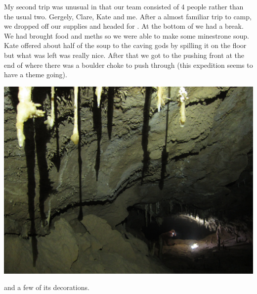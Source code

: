 
My second trip was unusual in that our team consisted of 4 people rather than the usual two. Gergely, Clare, Kate and me. After a almost familiar trip to camp, we dropped off our supplies and headed for . At the bottom of  we had a break. We had brought food and meths so we were able to make some minestrone soup. Kate offered about half of the soup to the caving gods by spilling it on the floor but what was left was really nice. After that we got to the pushing front at the end of  where there was a boulder choke to push through (this expedition seems to have a theme going). 



\begin{pagefigure}
\checkoddpage \ifoddpage \forcerectofloat \else \forceversofloat \fi
   \centering
\includegraphics[width = \textwidth]{2012/alex_pitcher/rhys/2012-08-03-0439-JanaCarga-046a--atlantis--orig.jpg}
\caption{ and a few of its decorations. } \label{atlantis}
\end{pagefigure}

